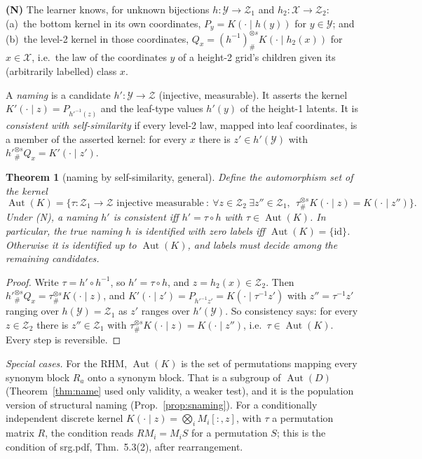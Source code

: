 \documentclass[11pt]{article}
\newtheorem{theorem}{Theorem}
\theoremstyle{definition}
\begin{document}
\medskip\noindent\textbf{(N)} The learner knows, for unknown bijections $h:\mathcal Y\to\mathcal Z_1$
and $h_2:\mathcal X\to\mathcal Z_2$:
(a)~the bottom kernel in its own coordinates, $P_y=K(\cdot\mid h(y))$ for $y\in\mathcal Y$; and
(b)~the level-2 kernel in those coordinates,
$Q_x=(h^{-1})^{\otimes s}_{\#}K(\cdot\mid h_2(x))$ for $x\in\mathcal X$, i.e.\ the law of the
coordinates $y$ of a height-2 grid's children given its (arbitrarily labelled) class $x$.
\medskip

\noindent A \emph{naming} is a candidate $h':\mathcal Y\to\mathcal Z$ (injective, measurable). It
asserts the kernel $K'(\cdot\mid z)=P_{h'^{-1}(z)}$ and the leaf-type values $h'(y)$ of the height-1
latents. It is \emph{consistent with self-similarity} if every level-2 law, mapped into leaf
coordinates, is a member of the asserted kernel: for every $x$ there is $z'\in h'(\mathcal Y)$ with
$h'^{\otimes s}_{\#}Q_x=K'(\cdot\mid z')$.

\begin{theorem}[naming by self-similarity, general]\label{thm:nameg}
Define the automorphism set of the kernel
\[
\operatorname{Aut}(K)=\Big\{\tau:\mathcal Z_1\to\mathcal Z\text{ injective measurable}\ :\
\forall z\in\mathcal Z_2\ \exists z''\in\mathcal Z_1,\ \ \tau^{\otimes s}_{\#}K(\cdot\mid z)=K(\cdot\mid z'')\Big\}.
\]
Under (N), a naming $h'$ is consistent iff $h'=\tau\circ h$ with $\tau\in\operatorname{Aut}(K)$. In
particular, the true naming $h$ is identified with zero labels iff $\operatorname{Aut}(K)=\{\mathrm{id}\}$.
Otherwise it is identified up to $\operatorname{Aut}(K)$, and labels must decide among the
remaining candidates.
\end{theorem}
\begin{proof}
Write $\tau=h'\circ h^{-1}$, so $h'=\tau\circ h$, and $z=h_2(x)\in\mathcal Z_2$. Then
$h'^{\otimes s}_{\#}Q_x=\tau^{\otimes s}_{\#}K(\cdot\mid z)$, and
$K'(\cdot\mid z')=P_{h'^{-1}z'}=K(\cdot\mid\tau^{-1}z')$ with $z''=\tau^{-1}z'$ ranging over
$h(\mathcal Y)=\mathcal Z_1$ as $z'$ ranges over $h'(\mathcal Y)$. So consistency says: for every
$z\in\mathcal Z_2$ there is $z''\in\mathcal Z_1$ with $\tau^{\otimes s}_{\#}K(\cdot\mid z)=K(\cdot\mid z'')$,
i.e.\ $\tau\in\operatorname{Aut}(K)$. Every step is reversible.
\end{proof}

\noindent\emph{Special cases.}
For the RHM, $\operatorname{Aut}(K)$ is the set of permutations mapping every synonym block
$R_a$ onto a synonym block. That is a subgroup of $\operatorname{Aut}(D)$
(Theorem~\ref{thm:name} used only validity, a weaker test), and it is the population version of
structural naming (Prop.~\ref{prop:snaming}). For a conditionally independent discrete kernel
$K(\cdot\mid z)=\bigotimes_iM_i[:,z]$, with $\tau$ a permutation matrix $R$, the condition reads
$RM_i=M_iS$ for a permutation $S$; this is the condition of srg.pdf, Thm.~5.3(2), after
rearrangement.
\end{document}
